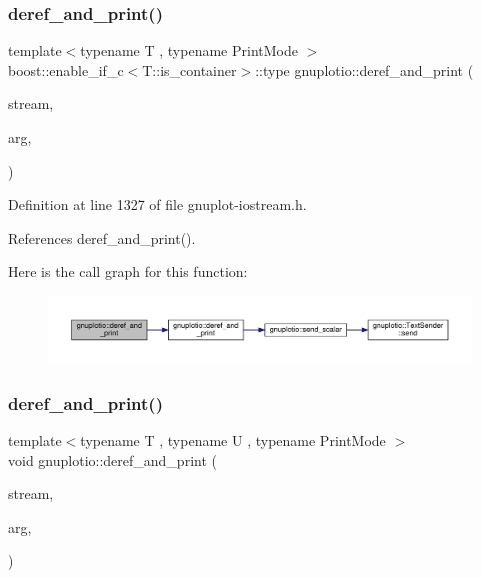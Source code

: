 \subsubsection{\texorpdfstring{deref\+\_\+and\+\_\+print()}{deref\_and\_print()}\hspace{0.1cm}{\footnotesize\ttfamily [2/4]}}
{\footnotesize\ttfamily template$<$typename T , typename Print\+Mode $>$ \\
boost\+::enable\+\_\+if\+\_\+c$<$T\+::is\+\_\+container$>$\+::type gnuplotio\+::deref\+\_\+and\+\_\+print (\begin{DoxyParamCaption}\item[{std\+::ostream \&}]{stream,  }\item[{const T \&}]{arg,  }\item[{Print\+Mode}]{ }\end{DoxyParamCaption})}



Definition at line 1327 of file gnuplot-\/iostream.\+h.



References deref\+\_\+and\+\_\+print().

Here is the call graph for this function\+:\nopagebreak
\begin{figure}[H]
\begin{center}
\leavevmode
\includegraphics[width=350pt]{namespacegnuplotio_a8c6b699dd18c419d597a008b74eda41a_cgraph}
\end{center}
\end{figure}
\mbox{\label{namespacegnuplotio_acd0cb4bd9679f0b75bac15c8afcc10e6}} 
\subsubsection{\texorpdfstring{deref\+\_\+and\+\_\+print()}{deref\_and\_print()}\hspace{0.1cm}{\footnotesize\ttfamily [3/4]}}
{\footnotesize\ttfamily template$<$typename T , typename U , typename Print\+Mode $>$ \\
void gnuplotio\+::deref\+\_\+and\+\_\+print (\begin{DoxyParamCaption}\item[{std\+::ostream \&}]{stream,  }\item[{const \hyperlink{classgnuplotio_1_1_pair_of_range}{Pair\+Of\+Range}$<$ T, U $>$ \&}]{arg,  }\item[{Print\+Mode}]{ }\end{DoxyParamCaption})}



